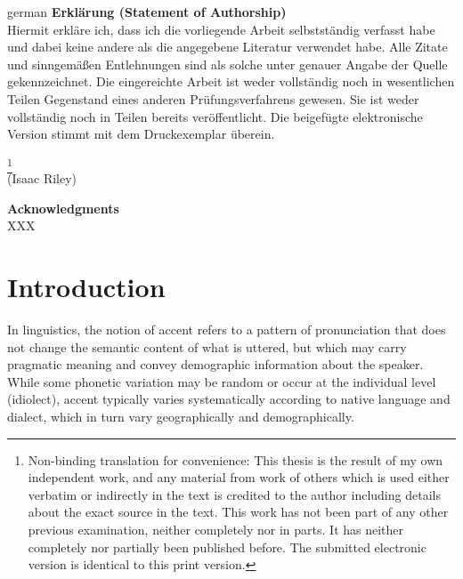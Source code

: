 \documentclass[12pt,leqno,a4paper]{article}
\begin{document}
\begin{otherlanguage}
{german}
\noindent\textbf{Erklärung (Statement of Authorship)}\\


\noindent Hiermit erkläre ich, dass ich die vorliegende Arbeit selbstständig verfasst habe und dabei keine andere als die angegebene Literatur verwendet habe. Alle Zitate und sinngemäßen Entlehnungen sind als solche unter genauer Angabe der Quelle gekennzeichnet. Die eingereichte Arbeit ist weder vollständig noch in wesentlichen Teilen Gegenstand eines anderen Prüfungsverfahrens gewesen. Sie ist weder vollständig noch in Teilen bereits veröffentlicht. Die beigefügte elektronische Version stimmt mit dem Druckexemplar überein.%
\end{otherlanguage}
\footnote{Non-binding translation for convenience: This thesis is the result of my own independent work, and any material from work of others which is used either verbatim or indirectly in the text is credited to the author including details about the exact source in the text. This work has not been part of any other previous examination, neither completely nor in parts. It has neither completely nor partially been published before. The submitted electronic version is identical to this print version.}\\[2cm]
\vspace{2cm}
(Isaac Riley)

\newpage
\thispagestyle{empty}
\noindent \textbf{Acknowledgments}\\
\noindent XXX

\newpage
\tableofcontents
\newpage

\section{Introduction}
In linguistics, the notion of accent refers to a pattern of pronunciation that does not change 
the semantic content of what is uttered, but which may carry pragmatic meaning and 
convey demographic information about the speaker. While some phonetic variation may be random 
or occur at the individual level (idiolect), accent typically varies systematically according 
to native language and dialect, which in turn vary geographically and demographically.
\end{document}
